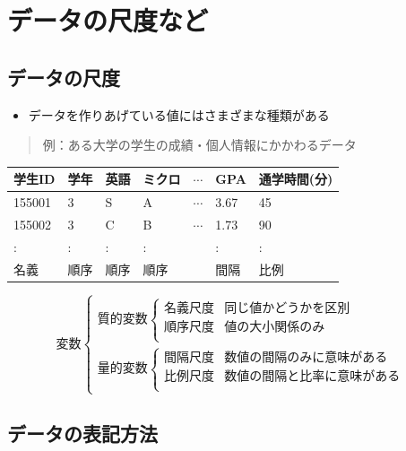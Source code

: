 \documentclass[
]{book}
\providecommand{\tightlist}{%
  \setlength{\itemsep}{0pt}\setlength{\parskip}{0pt}}
\theoremstyle{definition}
\theoremstyle{definition}
\theoremstyle{definition}
\theoremstyle{definition}
\theoremstyle{remark}
\begin{document}
\hypertarget{ux30c7ux30fcux30bfux306eux5c3aux5ea6ux306aux3069}{%
\chapter{データの尺度など}\label{ux30c7ux30fcux30bfux306eux5c3aux5ea6ux306aux3069}}

\hypertarget{ux30c7ux30fcux30bfux306eux5c3aux5ea6}{%
\section{データの尺度}\label{ux30c7ux30fcux30bfux306eux5c3aux5ea6}}

\begin{itemize}
\tightlist
\item
  データを作りあげている値にはさまざまな種類がある
\end{itemize}

\begin{quote}
例：ある大学の学生の成績・個人情報にかかわるデータ
\end{quote}

\begin{longtable}[]{@{}lllllll@{}}
\toprule()
学生ID & 学年 & 英語 & ミクロ & \(\cdots\) & GPA & 通学時間(分) \\
\midrule()
\endhead
155001 & 3 & S & A & \(\cdots\) & 3.67 & 45 \\
155002 & 3 & C & B & \(\cdots\) & 1.73 & 90 \\
: & : & : & : & & : & : \\
名義 & 順序 & 順序 & 順序 & & 間隔 & 比例 \\
\bottomrule()
\end{longtable}

\[
\text{変数}
\begin{cases}
\text{質的変数}
\begin{cases}
\text{名義尺度} & \text{同じ値かどうかを区別} \\
\text{順序尺度} & \text{値の大小関係のみ} \\
\end{cases} \\
\text{量的変数}
\begin{cases}
\text{間隔尺度} & \text{数値の間隔のみに意味がある} \\
\text{比例尺度} & \text{数値の間隔と比率に意味がある} \\
\end{cases}
\end{cases}
\]

\hypertarget{ux30c7ux30fcux30bfux306eux8868ux8a18ux65b9ux6cd5}{%
\section{データの表記方法}\label{ux30c7ux30fcux30bfux306eux8868ux8a18ux65b9ux6cd5}}
\end{document}
